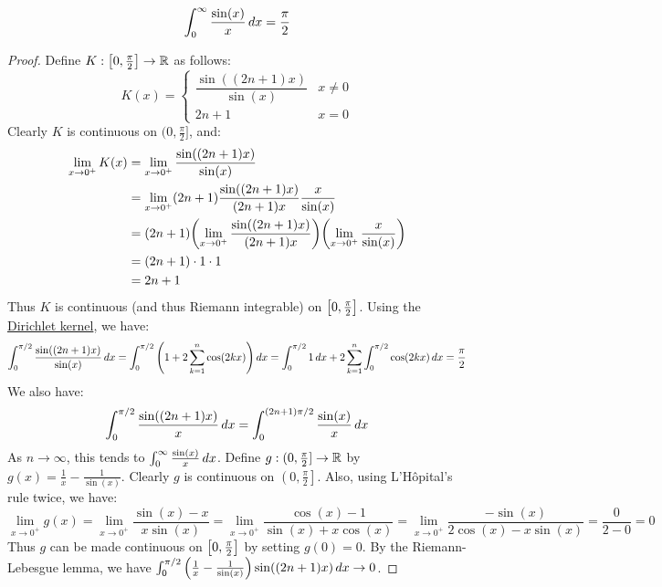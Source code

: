\documentclass[main.tex]{subfiles}
\begin{document}
\begin{theorem}
    \begin{equation*}
        \int_0^\infty \frac{\sin(x)}{x}\,dx = \frac{\pi}{2}
    \end{equation*}
\end{theorem}
\begin{proof}
    Define $K:\qty[0,\frac{\pi}{2}]\to\R$ as follows:
    \begin{equation*}
        K(x) = \begin{cases}
            \dfrac{\sin((2n+1)x)}{\sin(x)} & x\ne 0 \\
            2n+1 & x=0
        \end{cases}
    \end{equation*}
    Clearly $K$ is continuous on $\big(0,\frac{\pi}{2}\big]$, and:
    \begin{align*}
        \lim_{x\to0^+} K(x)
        &= \lim_{x\to0^+} \frac{\sin((2n+1)x)}{\sin(x)} \\
        &= \lim_{x\to0^+} (2n+1)\frac{\sin((2n+1)x)}{(2n+1)x}\frac{x}{\sin(x)} \\
        &= (2n+1)\qty(\lim_{x\to0^+} \frac{\sin((2n+1)x)}{(2n+1)x})\qty(\lim_{x\to0^+} \frac{x}{\sin(x)}) \\
        &= (2n+1) \cdot 1 \cdot 1 \\
        &= 2n+1
    \end{align*}
    Thus $K$ is continuous (and thus Riemann integrable) on $\qty[0,\frac{\pi}{2}]$. Using the \hyperref[dirichlet_kernel]{Dirichlet kernel}, we have:
    \begin{equation*}
        \int_0^{\pi/2} \frac{\sin((2n+1)x)}{\sin(x)}\,dx
        = \int_0^{\pi/2} \qty(1+2\sum_{k=1}^n\cos(2kx))\,dx
        = \int_0^{\pi/2} 1\,dx + 2\sum_{k=1}^n\int_0^{\pi/2} \cos(2kx)\,dx
        = \frac{\pi}{2}
    \end{equation*}
    We also have:
    \begin{equation*}
        \int_0^{\pi/2} \frac{\sin((2n+1)x)}{x}\,dx
        = \int_0^{(2n+1)\pi/2} \frac{\sin(x)}{x}\,dx
    \end{equation*}
    As $n\to\infty$, this tends to $\int_0^\infty \frac{\sin(x)}{x}\,dx$. Define $g:(0,\frac{\pi}{2}]\to\R$ by $g(x)=\frac{1}{x}-\frac{1}{\sin(x)}$. Clearly $g$ is continuous on $\left(0,\frac{\pi}{2}\right]$. Also, using L'Hôpital's rule twice, we have:
    \begin{equation*}
        \lim_{x\to0^+} g(x)
        = \lim_{x\to0^+} \frac{\sin(x)-x}{x\sin(x)}
        = \lim_{x\to0^+} \frac{\cos(x)-1}{\sin(x)+x\cos(x)}
        = \lim_{x\to0^+} \frac{-\sin(x)}{2\cos(x)-x\sin(x)}
        = \frac{0}{2-0}
        = 0
    \end{equation*}
    Thus $g$ can be made continuous on $\qty[0,\frac{\pi}{2}]$ by setting $g(0)=0$. By the Riemann-Lebesgue lemma, we have $\int_0^{\pi/2} \qty(\frac{1}{x}-\frac{1}{\sin(x)})\sin((2n+1)x)\,dx\to 0$.
\end{proof}
\end{document}
